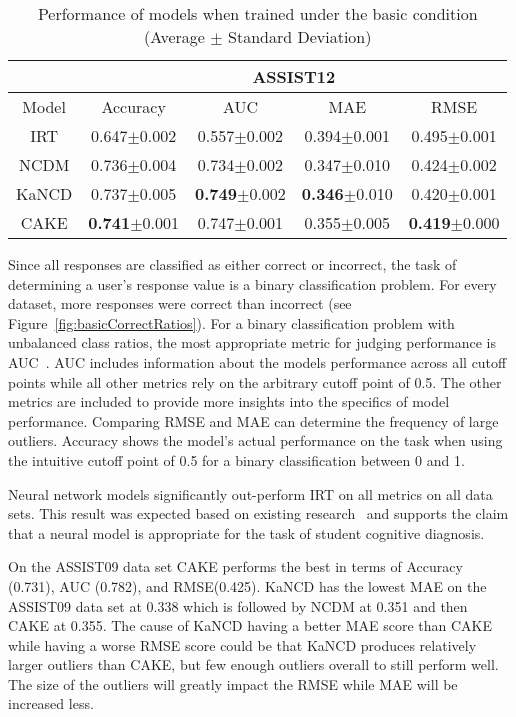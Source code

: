 \documentclass[letterpaper, 12pt, captions=tableabove]{scrreprt}
\begin{document}
\begin{table}[htbp]
			\begin{tabular}{ccccc}
				&\multicolumn{4}{c}{ASSIST12}\\ \hline
				Model&Accuracy&AUC&MAE&RMSE  \\ \hline
				IRT&0.647$\pm$0.002&0.557$\pm$0.002&0.394$\pm$0.001&0.495$\pm$0.001\\
				NCDM&0.736$\pm$0.004&0.734$\pm$0.002&0.347$\pm$0.010&0.424$\pm$0.002\\
				KaNCD&0.737$\pm$0.005&\textbf{0.749}$\pm$0.002&\textbf{0.346}$\pm$0.010&0.420$\pm$0.001\\
				CAKE&\textbf{0.741}$\pm$0.001&0.747$\pm$0.001&0.355$\pm$0.005&\textbf{0.419}$\pm$0.000\\
			\end{tabular}
			\captionsetup{justification=centering}
			\caption{Performance of models when trained under the basic condition (Average $\pm$ Standard Deviation)}
			\label{tab:basicResults}
		\end{table}

Since all responses are classified as either correct or incorrect, the task of determining a user's response value is a binary classification problem. For every dataset, more responses were correct than incorrect (see Figure~\ref{fig:basicCorrectRatios}). For a binary classification problem with unbalanced class ratios, the most appropriate metric for judging performance is AUC~\cite{wang2023}. AUC includes information about the models performance across all cutoff points while all other metrics rely on the arbitrary cutoff point of 0.5. The other metrics are included to provide more insights into the specifics of model performance. Comparing RMSE and MAE can determine the frequency of large outliers. Accuracy shows the model's actual performance on the task when using the intuitive cutoff point of 0.5 for a binary classification between 0 and 1.
		
Neural network models significantly out-perform IRT on all metrics on all data sets. This result was expected based on existing research~\cite{wang2022} and supports the claim that a neural model is appropriate for the task of student cognitive diagnosis. 

On the ASSIST09 data set CAKE performs the best in terms of Accuracy (0.731), AUC (0.782), and RMSE(0.425). KaNCD has the lowest MAE on the ASSIST09 data set at 0.338 which is followed by NCDM at 0.351 and then CAKE at 0.355. The cause of KaNCD having a better MAE score than CAKE while having a worse RMSE score could be that KaNCD produces relatively larger outliers than CAKE, but few enough outliers overall to still perform well. The size of the outliers will greatly impact the RMSE while MAE will be increased less.
\end{document}
